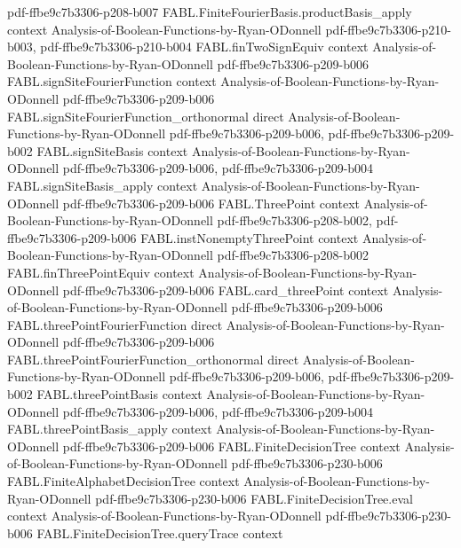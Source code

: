 \begin{theorem}
{    pdf-ffbe9c7b3306-p208-b007}
\proofstep
  {FABL.FiniteFourierBasis.productBasis_apply}
  {context}
  {Analysis-of-Boolean-Functions-by-Ryan-ODonnell}
  {pdf-ffbe9c7b3306-p210-b003,
    pdf-ffbe9c7b3306-p210-b004}
\proofstep
  {FABL.finTwoSignEquiv}
  {context}
  {Analysis-of-Boolean-Functions-by-Ryan-ODonnell}
  {pdf-ffbe9c7b3306-p209-b006}
\proofstep
  {FABL.signSiteFourierFunction}
  {context}
  {Analysis-of-Boolean-Functions-by-Ryan-ODonnell}
  {pdf-ffbe9c7b3306-p209-b006}
\proofstep
  {FABL.signSiteFourierFunction_orthonormal}
  {direct}
  {Analysis-of-Boolean-Functions-by-Ryan-ODonnell}
  {pdf-ffbe9c7b3306-p209-b006,
    pdf-ffbe9c7b3306-p209-b002}
\proofstep
  {FABL.signSiteBasis}
  {context}
  {Analysis-of-Boolean-Functions-by-Ryan-ODonnell}
  {pdf-ffbe9c7b3306-p209-b006,
    pdf-ffbe9c7b3306-p209-b004}
\proofstep
  {FABL.signSiteBasis_apply}
  {context}
  {Analysis-of-Boolean-Functions-by-Ryan-ODonnell}
  {pdf-ffbe9c7b3306-p209-b006}
\proofstep
  {FABL.ThreePoint}
  {context}
  {Analysis-of-Boolean-Functions-by-Ryan-ODonnell}
  {pdf-ffbe9c7b3306-p208-b002,
    pdf-ffbe9c7b3306-p209-b006}
\proofstep
  {FABL.instNonemptyThreePoint}
  {context}
  {Analysis-of-Boolean-Functions-by-Ryan-ODonnell}
  {pdf-ffbe9c7b3306-p208-b002}
\proofstep
  {FABL.finThreePointEquiv}
  {context}
  {Analysis-of-Boolean-Functions-by-Ryan-ODonnell}
  {pdf-ffbe9c7b3306-p209-b006}
\proofstep
  {FABL.card_threePoint}
  {context}
  {Analysis-of-Boolean-Functions-by-Ryan-ODonnell}
  {pdf-ffbe9c7b3306-p209-b006}
\proofstep
  {FABL.threePointFourierFunction}
  {direct}
  {Analysis-of-Boolean-Functions-by-Ryan-ODonnell}
  {pdf-ffbe9c7b3306-p209-b006}
\proofstep
  {FABL.threePointFourierFunction_orthonormal}
  {direct}
  {Analysis-of-Boolean-Functions-by-Ryan-ODonnell}
  {pdf-ffbe9c7b3306-p209-b006,
    pdf-ffbe9c7b3306-p209-b002}
\proofstep
  {FABL.threePointBasis}
  {context}
  {Analysis-of-Boolean-Functions-by-Ryan-ODonnell}
  {pdf-ffbe9c7b3306-p209-b006,
    pdf-ffbe9c7b3306-p209-b004}
\proofstep
  {FABL.threePointBasis_apply}
  {context}
  {Analysis-of-Boolean-Functions-by-Ryan-ODonnell}
  {pdf-ffbe9c7b3306-p209-b006}
\proofstep
  {FABL.FiniteDecisionTree}
  {context}
  {Analysis-of-Boolean-Functions-by-Ryan-ODonnell}
  {pdf-ffbe9c7b3306-p230-b006}
\proofstep
  {FABL.FiniteAlphabetDecisionTree}
  {context}
  {Analysis-of-Boolean-Functions-by-Ryan-ODonnell}
  {pdf-ffbe9c7b3306-p230-b006}
\proofstep
  {FABL.FiniteDecisionTree.eval}
  {context}
  {Analysis-of-Boolean-Functions-by-Ryan-ODonnell}
  {pdf-ffbe9c7b3306-p230-b006}
\proofstep
  {FABL.FiniteDecisionTree.queryTrace}
  {context}

\end{theorem}
